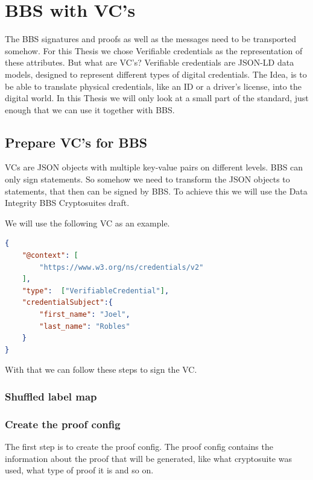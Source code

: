 \documentclass[
	a4paper               %
	,bibliography=totoc   %
	,listof=totoc         %
	,monolingual
	twoside=false,
]{bfhthesis}              %
\begin{document}
\section{BBS with VC's}
The BBS signatures and proofs as well as the messages need to be transported somehow.
For this Thesis we chose Verifiable credentials \cite{verifiable-credentials} as the representation of these attributes.
But what are VC's? \newline
Verifiable credentials are JSON-LD data models, designed to represent different types of digital credentials.
The Idea, is to be able to translate physical credentials, like an ID or a driver's license, into the digital world.
In this Thesis we will only look at a small part of the standard, just enough that we can use it together with BBS.

\subsection{Prepare VC's for BBS}
VCs are JSON objects with multiple key-value pairs on different levels.
BBS can only sign statements.
So somehow we need to transform the JSON objects to statements, that then can be signed by BBS.
To achieve this we will use the Data Integrity BBS Cryptosuites draft\cite{bbsvc}.

We will use the following VC as an example.
\begin{lstlisting}[language=json,firstnumber=1,caption={Example VC},captionpos=b]
{
	"@context": [
		"https://www.w3.org/ns/credentials/v2"
	],
	"type":  ["VerifiableCredential"],
	"credentialSubject":{
		"first_name": "Joel",
		"last_name": "Robles"
	}
}
\end{lstlisting}

With that we can follow these steps to sign the VC.

\subsubsection{Shuffled label map}
\label{sub:shuffledlabelmap}

\subsubsection{Create the proof config}
The first step is to create the proof config.
The proof config contains the information about the proof that will be generated, like what cryptosuite was used, what type of proof it is and so on.
\end{document}
